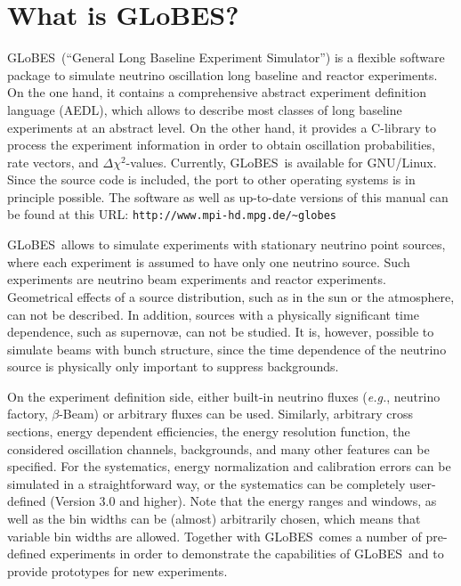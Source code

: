 \documentclass[a4paper,12pt,twoside]{book}
\newcommand{\eg}{{\it e.g.}}
\newcommand{\GLOBES}{{\sf GLoBES}}
\begin{document}
\cleardoublepage
\setcounter{page}{1}

\chapter*{What is \GLOBES ?}

\vspace*{-4ex}
\GLOBES\ (``General Long Baseline Experiment Simulator'') is a flexible
software package to simulate neutrino oscillation 
long baseline and reactor experiments. On the
one hand, it contains a comprehensive abstract experiment definition
language (AEDL), which allows to describe most classes 
of long baseline experiments
at an abstract level. On the other hand, it provides a C-library to
process the experiment information in order to obtain oscillation
probabilities, rate vectors, and $\Delta \chi^2$-values. Currently, 
\GLOBES\ is available for GNU/Linux. Since the source code is included,
the port to other operating systems is in principle possible. The software
as well as up-to-date versions of this manual can be found at this URL:
 \verb+http://www.mpi-hd.mpg.de/~globes+

\GLOBES\ allows to simulate experiments with stationary neutrino point sources, where each experiment is assumed to have only one neutrino source.
Such experiments are neutrino beam experiments and reactor experiments. 
Geometrical effects of a source distribution, such as in the sun or the 
atmosphere, can not be described. In addition, sources with a physically 
significant time dependence, such as supernov\ae, can not be studied. It 
is, however, possible to simulate beams with bunch structure, since the 
time dependence of the neutrino source is physically only important to suppress backgrounds. 

On the experiment definition side, either built-in neutrino fluxes
(\eg, neutrino factory, $\beta$-Beam) or arbitrary fluxes can be used. Similarly,
arbitrary cross sections, energy dependent efficiencies, the
energy resolution function, the considered oscillation channels, 
backgrounds, and many other features can be specified. 
For the systematics, energy
normalization and calibration errors can be simulated in a straightforward way,
or the systematics can be completely user-defined (Version 3.0 and higher). Note that
the energy ranges and windows, as well as the bin widths can be
(almost) arbitrarily chosen, which means that variable bin
widths are allowed. Together with \GLOBES\ comes a number of
pre-defined experiments in order to demonstrate the capabilities
of \GLOBES\ and to provide prototypes for new experiments.
\end{document}

